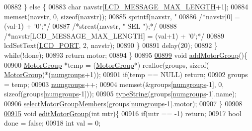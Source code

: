 \begin{DoxyCode}
{{{{{{{{{{{{{00882         \} \textcolor{keywordflow}{else} \{
00883             \textcolor{keywordtype}{char} navstr[\hyperlink{lcdmsg_8h_abe4c4b70fc6f44ae3680e5b2c68cdd00}{LCD\_MESSAGE\_MAX\_LENGTH}+1];
00884             memset(navstr, 0, \textcolor{keyword}{sizeof}(navstr));
00885             sprintf(navstr, \textcolor{stringliteral}{"%
00886             \textcolor{comment}{/*navstr[0] = (val-1) + '0';*/}
00887             \textcolor{comment}{/*strcat(navstr, "      SEL     ");*/}
00888             \textcolor{comment}{/*navstr[LCD\_MESSAGE\_MAX\_LENGTH] = (val+1) + '0';*/}
00889             lcdSetText(\hyperlink{lcdmsg_8h_abcf42bd88b3c36193f301ca25b033875}{LCD\_PORT}, 2, navstr);
00890         \}
00891         delay(20);
00892     \} \textcolor{keywordflow}{while}(!done);
00893     \textcolor{keywordflow}{return} motor;
00894 \}
00895 
\hypertarget{lcddiag_8c_source.tex_l00899}{}\hyperlink{lcddiag_8c_a9cffea5742f16bfef41b3dcf6d66cd7d}{00899} \textcolor{keywordtype}{void} \hyperlink{lcddiag_8c_a9cffea5742f16bfef41b3dcf6d66cd7d}{addMotorGroup}()\{
00900     \hyperlink{struct_motor_group}{MotorGroup} *temp = (\hyperlink{struct_motor_group}{MotorGroup}*) realloc(groups, \textcolor{keyword}{sizeof}(
      \hyperlink{struct_motor_group}{MotorGroup})*(\hyperlink{lcddiag_8c_a205f1cedec1664555276e0a71a1c87d8}{numgroups}+1));
00901     \textcolor{keywordflow}{if}(temp == NULL) \textcolor{keywordflow}{return};
00902     groups = temp;
00903     \hyperlink{lcddiag_8c_a205f1cedec1664555276e0a71a1c87d8}{numgroups}++;
00904     memset(&groups[\hyperlink{lcddiag_8c_a205f1cedec1664555276e0a71a1c87d8}{numgroups}-1], 0, \textcolor{keyword}{sizeof}(groups[\hyperlink{lcddiag_8c_a205f1cedec1664555276e0a71a1c87d8}{numgroups}-1]));
00905     \hyperlink{lcddiag_8c_a17fe3ffc769a6d02c5226b3bfb79f28f}{typeString}(groups[\hyperlink{lcddiag_8c_a205f1cedec1664555276e0a71a1c87d8}{numgroups}-1].name);
00906     \hyperlink{lcddiag_8c_a72f3f96c95c24f67103b2eb30995dccb}{selectMotorGroupMembers}(groups[\hyperlink{lcddiag_8c_a205f1cedec1664555276e0a71a1c87d8}{numgroups}-1].motor);
00907 \}
00908 
\hypertarget{lcddiag_8c_source.tex_l00915}{}\hyperlink{lcddiag_8c_a8e26ee136d643c9e069d89be0e6b019e}{00915} \textcolor{keywordtype}{void} \hyperlink{lcddiag_8c_a8e26ee136d643c9e069d89be0e6b019e}{editMotorGroup}(\textcolor{keywordtype}{int} mtr)\{
00916     \textcolor{keywordflow}{if}(mtr == -1) \textcolor{keywordflow}{return};
00917     \textcolor{keywordtype}{bool} done = \textcolor{keyword}{false};
00918     \textcolor{keywordtype}{int} val = 0;
}}}}}}}}}}}}}}
\end{DoxyCode}
